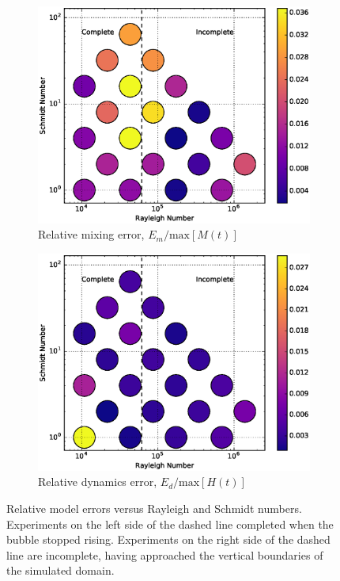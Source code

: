 \begin{figure}
\begin{subfigure}[b]{0.5\textwidth}
\includegraphics[width=\textwidth]{figs/MixingError-vs-Rayleigh-Schmidt}
\caption{Relative mixing error, $E_m/\text{max}[M(t)]$}
\end{subfigure}
\begin{subfigure}[b]{0.5\textwidth}
\includegraphics[width=\textwidth]{figs/DynamicsError-vs-Rayleigh-Schmidt}
\caption{Relative dynamics error, $E_d/\text{max}[H(t)]$}
\end{subfigure}
\caption{ 
  Relative model errors versus Rayleigh and Schmidt numbers.
  Experiments on the left side of the dashed line completed when the bubble stopped rising.
  Experiments on the right side of the dashed line are incomplete, having approached the vertical boundaries of the simulated domain.
}
\end{figure}

